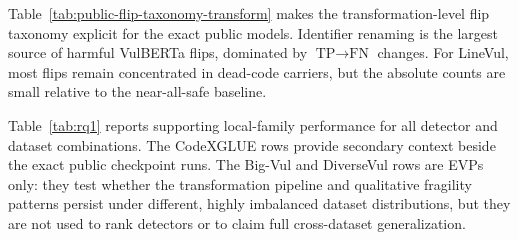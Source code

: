 \documentclass[a4paper,fleqn]{cas-dc}
\begin{document}
Table~\ref{tab:public-flip-taxonomy-transform} makes the transformation-level
flip taxonomy explicit for the exact public models. Identifier renaming is the
largest source of harmful VulBERTa flips, dominated by
$\text{TP}\rightarrow\text{FN}$ changes. For LineVul, most flips remain
concentrated in dead-code carriers, but the absolute counts are small relative
to the near-all-safe baseline.

\begin{table}[t]
  \centering
  \caption{Per-transformation harmful and beneficial flips for exact public models on CodeXGLUE. H-TPFN is true-positive to false-negative; H-TNFP is true-negative to false-positive.}
  \label{tab:public-flip-taxonomy-transform}
\end{table}

Table~\ref{tab:rq1} reports supporting local-family performance for all
detector and dataset combinations. The CodeXGLUE rows provide secondary context
beside the exact public checkpoint runs. The Big-Vul and DiverseVul rows are
EVPs only: they test whether the transformation pipeline
and qualitative fragility patterns persist under different, highly imbalanced
dataset distributions, but they are not used to rank detectors or to claim full
cross-dataset generalization.
\end{document}
